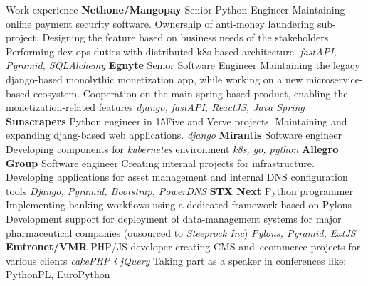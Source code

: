 \begin{rubric}{Work experience}
\textbf{Nethone/Mangopay}\newline
    Senior Python Engineer\newline
    Maintaining online payment security software. Ownership of anti-money
        laundering sub-project. Designing the feature based on business needs
        of the stakeholders. Performing dev-ops duties with distributed
        k8s-based architecture.\newline
    \textit{fastAPI, Pyramid, SQLAlchemy}
\textbf{Egnyte}\newline
    Senior Software Engineer\newline
    Maintaining the legacy django-based monolythic monetization app, while working
        on a new microservice-based ecosystem. Cooperation on the main
        spring-based product, enabling the monetization-related features\newline
    \textit{django, fastAPI, ReactJS, Java Spring}
\textbf{Sunscrapers}\newline
    Python engineer in 15Five and Verve projects. Maintaining and expanding
        djang-based web applications.\newline
    \textit{django}
\textbf{Mirantis}\newline
    Software engineer\newline
    Developing components for \textit{kubernetes} environment\newline
    \textit{k8s, go, python}
\textbf{Allegro Group}\newline
    Software engineer\newline
    Creating internal projects for infrastructure. Developing applications for
        asset management and internal DNS configuration tools\newline
    \textit{Django, Pyramid, Bootstrap, PowerDNS}
\textbf{STX Next}\newline
    Python programmer\newline
    Implementing banking workflows using a dedicated framework based on Pylons
    Development support for deployment of data-management systems for major
    pharmaceutical companies (ousourced to \textit{Steeprock Inc})\newline
    \textit{Pylons, Pyramid, ExtJS}
\textbf{Emtronet/VMR}
    PHP/JS developer\newline
    creating CMS and~\hbox{ecommerce} projects for various clients\newline
    \textit{cakePHP i jQuery}
\entry*[other]Taking part as a speaker in conferences like:\newline
    PythonPL, EuroPython
\end{rubric}
